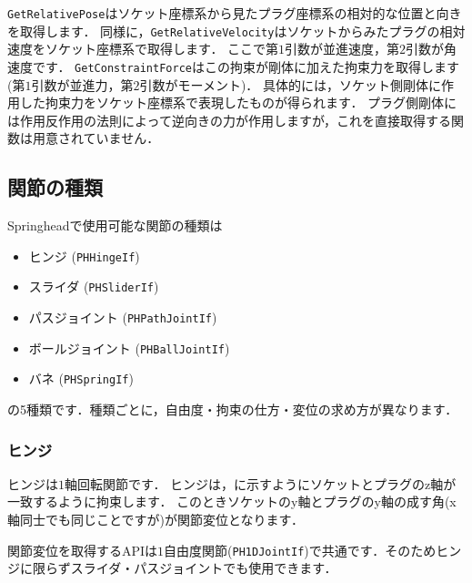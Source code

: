 \texttt{GetRelativePose}はソケット座標系から見たプラグ座標系の相対的な位置と向きを取得します．
\KLUDGE 同様に，\texttt{GetRelativeVelocity}はソケットからみたプラグの相対速度をソケット座標系で取得します．
\KLUDGE ここで第$1$引数が並進速度，第$2$引数が角速度です．
\texttt{GetConstraintForce}はこの拘束が剛体に加えた拘束力を取得します(第$1$引数が並進力，第$2$引数がモーメント)．
\KLUDGE 具体的には，ソケット側剛体に作用した拘束力をソケット座標系で表現したものが得られます．
\KLUDGE プラグ側剛体には作用反作用の法則によって逆向きの力が作用しますが，これを直接取得する関数は用意されていません．





\KLUDGE %
\subsection*{関節の種類}

Springheadで使用可能な関節の種類は

\begin{itemize}
\item ヒンジ (\texttt{PHHingeIf})
\item スライダ (\texttt{PHSliderIf})
\item パスジョイント (\texttt{PHPathJointIf})
\item ボールジョイント (\texttt{PHBallJointIf})
\item バネ (\texttt{PHSpringIf})
\end{itemize}

\KLUDGE の5種類です．種類ごとに，自由度・拘束の仕方・変位の求め方が異なります．


\KLUDGE %
\subsubsection*{ヒンジ}

\begin{fig}
\end{fig}

\KLUDGE ヒンジは$1$軸回転関節です．
\KLUDGE ヒンジは，に示すようにソケットとプラグのz軸が一致するように拘束します．
\KLUDGE このときソケットのy軸とプラグのy軸の成す角(x軸同士でも同じことですが)が関節変位となります．

\KLUDGE 関節変位を取得するAPIは$1$自由度関節(\texttt{PH1DJointIf})で共通です．そのためヒンジに限らずスライダ・パスジョイントでも使用できます．


